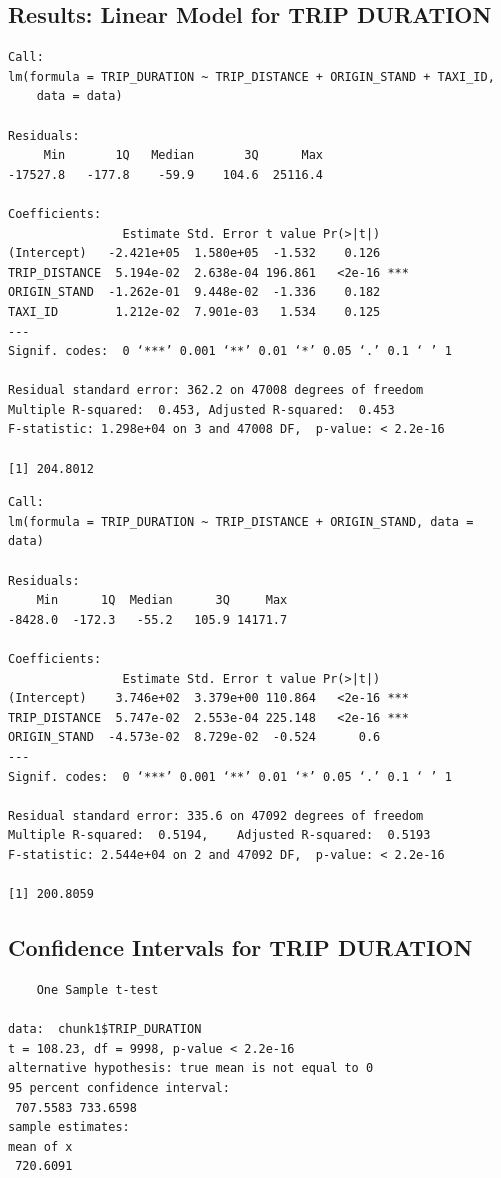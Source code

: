 \documentclass{article}
\numberwithin{equation}{section}
\begin{document}
\subsection{Results: Linear Model for TRIP DURATION}
\begin{verbatim}
Call:
lm(formula = TRIP_DURATION ~ TRIP_DISTANCE + ORIGIN_STAND + TAXI_ID, 
    data = data)

Residuals:
     Min       1Q   Median       3Q      Max 
-17527.8   -177.8    -59.9    104.6  25116.4 

Coefficients:
                Estimate Std. Error t value Pr(>|t|)    
(Intercept)   -2.421e+05  1.580e+05  -1.532    0.126    
TRIP_DISTANCE  5.194e-02  2.638e-04 196.861   <2e-16 ***
ORIGIN_STAND  -1.262e-01  9.448e-02  -1.336    0.182    
TAXI_ID        1.212e-02  7.901e-03   1.534    0.125    
---
Signif. codes:  0 ‘***’ 0.001 ‘**’ 0.01 ‘*’ 0.05 ‘.’ 0.1 ‘ ’ 1

Residual standard error: 362.2 on 47008 degrees of freedom
Multiple R-squared:  0.453,	Adjusted R-squared:  0.453 
F-statistic: 1.298e+04 on 3 and 47008 DF,  p-value: < 2.2e-16

[1] 204.8012   
\end{verbatim}

\begin{verbatim}
Call:
lm(formula = TRIP_DURATION ~ TRIP_DISTANCE + ORIGIN_STAND, data = data)

Residuals:
    Min      1Q  Median      3Q     Max 
-8428.0  -172.3   -55.2   105.9 14171.7 

Coefficients:
                Estimate Std. Error t value Pr(>|t|)    
(Intercept)    3.746e+02  3.379e+00 110.864   <2e-16 ***
TRIP_DISTANCE  5.747e-02  2.553e-04 225.148   <2e-16 ***
ORIGIN_STAND  -4.573e-02  8.729e-02  -0.524      0.6    
---
Signif. codes:  0 ‘***’ 0.001 ‘**’ 0.01 ‘*’ 0.05 ‘.’ 0.1 ‘ ’ 1

Residual standard error: 335.6 on 47092 degrees of freedom
Multiple R-squared:  0.5194,	Adjusted R-squared:  0.5193 
F-statistic: 2.544e+04 on 2 and 47092 DF,  p-value: < 2.2e-16

[1] 200.8059
\end{verbatim}

\subsection{Confidence Intervals for TRIP DURATION} 
\begin{verbatim}
	One Sample t-test

data:  chunk1$TRIP_DURATION
t = 108.23, df = 9998, p-value < 2.2e-16
alternative hypothesis: true mean is not equal to 0
95 percent confidence interval:
 707.5583 733.6598
sample estimates:
mean of x 
 720.6091    
\end{verbatim}
\end{document}
